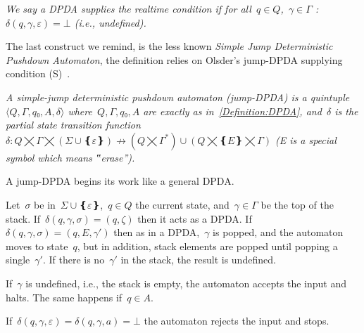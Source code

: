 \begin{Definition}
  \label{Definition:realtime}
  \slshape
We say a DPDA supplies the \emph{realtime condition} if
  for all~$q∈Q$,~$γ∈Γ$ :~$δ(q,γ,ε)=⊥$ (i.e., undefined).
\end{Definition}
%

The last construct we remind, is the less known \emph{Simple Jump Deterministic Pushdown Automaton},
the definition relies on Olsder's jump-DPDA supplying condition (S)~\cite{Olsder:05}.

\begin{Definition}
  \label{Definition:JDPDA}
  \slshape
  A \emph{simple-jump deterministic pushdown automaton} (jump-DPDA) is a quintuple~$⟨Q,Γ,q₀,A,δ⟩$
  where~$Q,Γ,q₀,A$ are exactly as in~\cref{Definition:DPDA},
  and~$δ$ is the
  \emph{partial state transition function}~$δ:Q⨉Γ⨉(Σ∪❴ε❵)↛(Q⨉Γ^*)∪(Q⨉❴E❵⨉Γ)$
  (E is a special symbol which means ‟erase”).
  \par
  A jump-DPDA begins its work like a general DPDA\@.
  \par
  Let~$σ$ be in~$Σ∪❴ε❵$,~$q∈Q$ the current state, and~$γ∈Γ$ be the top of the stack.
  If~$δ(q,γ,σ)=(q,ζ)$ then it acts as a DPDA.
  If~$δ(q,γ,σ)=(q,E,γ')$ then as in a DPDA,~$γ$ is popped, and the automaton
  moves to state~$q$, but in addition, stack elements are popped until
  popping a single~$γ'$.
  If there is no~$γ'$ in the stack, the result is undefined.
  \par
  If~$γ$ is undefined, i.e., the stack is empty, the automaton accepts the input and halts.
  The same happens if~$q∈A$.
  \par
  If~$δ(q,γ,ε)=δ(q,γ,a)=⊥$ the automaton rejects the input and stops.
\end{Definition}

